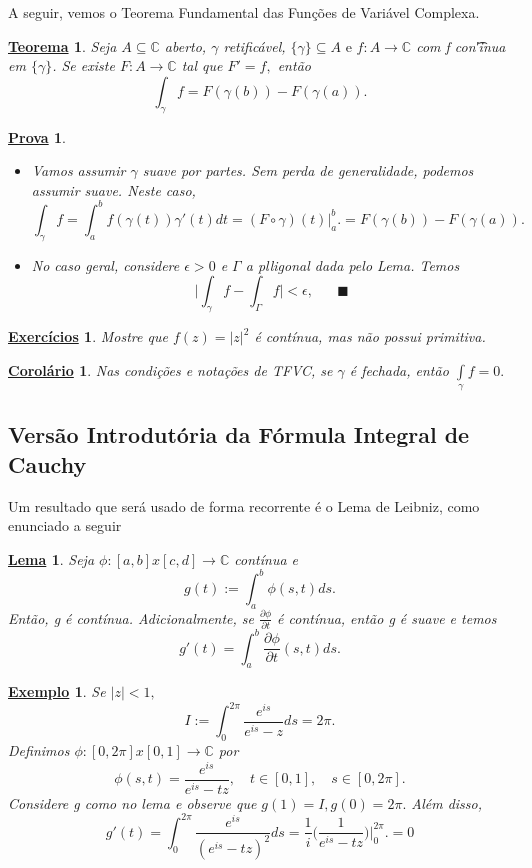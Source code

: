 \documentclass{article}
\newtheorem*{theorem*}{\underline{Teorema}}
\newtheorem{example}{\underline{Exemplo}}[section]
\newtheorem*{proof*}{\underline{Prova}}
\newtheorem*{crl*}{\underline{Corol\'ario}}
\newtheorem*{lmm*}{\underline{Lema}}
\newtheorem*{exer*}{\underline{Exerc\'icios}}
\renewcommand\qedsymbol{$\blacksquare$}
\begin{document}
A seguir, vemos o Teorema Fundamental das Fun\c c\~oes de Vari\'avel Complexa.
\begin{theorem*}
  Seja $A\subseteq{\mathbb{C}}$ aberto, $\gamma$ retific\'avel, $\{\gamma\}\subseteq{A}\text{ e }f:A\rightarrow \mathbb{C} $ com f 
con\t'inua em $\{\gamma\} $. Se existe $F:A\rightarrow \mathbb{C}$ tal que $F' = f,$ ent\~ao
  $$
    \int_{\gamma}^{}f = F(\gamma(b)) - F(\gamma(a)).
  $$
\end{theorem*}
\begin{proof*}
 \begin{itemize}
   \item[i)] Vamos assumir $\gamma$ suave por partes. Sem perda de generalidade, podemos assumir suave. Neste caso,
   $$
     \int_{\gamma}^{}f = \int_{a}^{b} f(\gamma(t))\gamma'(t)dt = (F\circ{\gamma})(t)\biggl|_a^b\biggr. = F(\gamma(b)) - F(\gamma(a)).
   $$
   \item[ii)] No caso geral, considere $\epsilon > 0$ e $\Gamma$ a plligonal dada pelo Lema. Temos
   $$
     \biggl|\int_{\gamma}^{}f - \int_{\Gamma}^{}f\biggr| < \epsilon, \quad\text{ \qedsymbol}
   $$
 \end{itemize}
\end{proof*}
\begin{exer*}
  Mostre que $f(z) = |z|^2$ \'e cont\'inua, mas n\~ao possui primitiva.
\end{exer*}
\begin{crl*}
  Nas condi\c c\~oes e nota\c c\~oes de TFVC, se $\gamma$ \'e fechada, ent\~ao $\int\limits_{\gamma}f = 0.$
\end{crl*}

\subsection{Vers\~ao Introdut\'oria da F\'ormula Integral de Cauchy}
  Um resultado que ser\'a usado de forma recorrente \'e o Lema de Leibniz, como enunciado a seguir
 \begin{lmm*}
   Seja $\phi:[a, b]x[c, d]\rightarrow \mathbb{C}$ cont\'inua e 
   $$
     g(t):= \int_{a}^{b}\phi(s, t)ds.
   $$
   Ent\~ao, g \'e cont\'inua. Adicionalmente, se $\frac{\partial{\phi}}{\partial{t}}$ \'e cont\'inua, ent\~ao g \'e suave e temos
   $$
    g'(t) = \int_{a}^{b}\frac{\partial{\phi}}{\partial{t}}(s, t)ds.
   $$
 \end{lmm*}
\begin{example}
  Se $|z| < 1,$
  $$
    I:= \int_{0}^{2\pi}\frac{e^{is}}{e^{is}-z}ds = 2\pi.
  $$
  Definimos $\phi:[0, 2\pi]x[0, 1]\rightarrow \mathbb{C}$ por 
  $$
    \phi(s, t) = \frac{e^{is}}{e^{is} - tz}, \quad t\in[0, 1], \quad s\in[0, 2\pi].
  $$
  Considere g como no lema e observe que $g(1) = I, g(0) = 2\pi.$ Al\'em disso,
  $$
    g'(t) = \int_{0}^{2\pi}\frac{e^{is}}{(e^{is} - tz)^{2}}ds = \frac{1}{i}\biggl(\frac{1}{e^{is}-tz}\biggr)\biggl|_0^{2\pi}\biggr. = 0
  $$
\end{example}
\newpage
\end{document}
